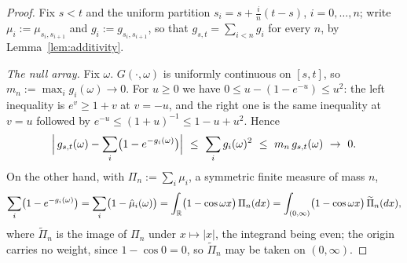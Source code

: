 \begin{proof}
Fix $s < t$ and the uniform partition $s_i = s + \tfrac in(t-s)$, $i = 0,\dots,n$; write
$\mu_i := \mu_{s_i,s_{i+1}}$ and $g_i := g_{s_i,s_{i+1}}$, so that
$g_{s,t} = \sum_{i<n} g_i$ for every $n$, by Lemma~\ref{lem:additivity}.

\emph{The null array.} Fix $\omega$. $G(\cdot,\omega)$ is uniformly continuous on $[s,t]$, so
$m_n := \max_i g_i(\omega) \to 0$. For $u \ge 0$ we have $0 \le u - (1 - e^{-u}) \le u^2$: the
left inequality is $e^v \ge 1 + v$ at $v = -u$, and the right one is the same inequality at
$v = u$ followed by $e^{-u} \le (1+u)^{-1} \le 1 - u + u^2$. Hence
\[
  \Bigl|\,g_{s,t}(\omega) - \sum_i \bigl(1 - e^{-g_i(\omega)}\bigr)\Bigr|
  \ \le\ \sum_i g_i(\omega)^2
  \ \le\ m_n\,g_{s,t}(\omega) \ \to\ 0 .
\]
On the other hand, with $\Pi_n := \sum_i \mu_i$, a symmetric finite measure of mass $n$,
\[
  \sum_i \bigl(1 - e^{-g_i(\omega)}\bigr) = \sum_i \bigl(1 - \hat\mu_i(\omega)\bigr)
  = \int_{\mathbb{R}} \bigl(1 - \cos\omega x\bigr)\,\Pi_n(dx)
  = \int_{(0,\infty)} \bigl(1 - \cos\omega x\bigr)\,\widetilde\Pi_n(dx),
\]
where $\widetilde\Pi_n$ is the image of $\Pi_n$ under $x \mapsto |x|$, the integrand being
even; the origin carries no weight, since $1 - \cos 0 = 0$, so $\widetilde\Pi_n$ may be taken
on $(0,\infty)$.


\end{proof}
